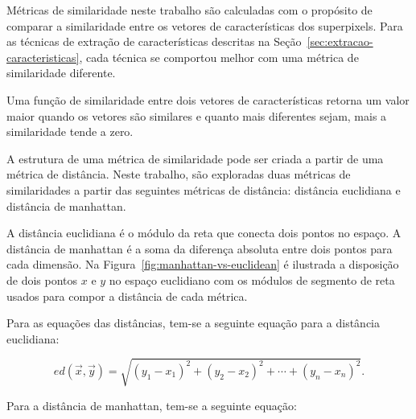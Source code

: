 Métricas de similaridade neste trabalho são calculadas com o propósito
de comparar a similaridade entre os vetores de características dos
superpixels. Para as técnicas de extração de características descritas
na Seção~\ref{sec:extracao-caracteristicas}, cada técnica se comportou
melhor com uma métrica de similaridade diferente.

Uma função de similaridade entre dois vetores de características
retorna um valor maior quando os vetores são similares e quanto mais
diferentes sejam, mais a similaridade tende a zero.

A estrutura de uma métrica de similaridade pode ser criada a partir de
uma métrica de distância. Neste trabalho, são exploradas duas métricas de
similaridades a partir das seguintes métricas de distância: distância
euclidiana e distância de manhattan.

A distância euclidiana é o módulo da reta que conecta dois pontos no
espaço. A distância de manhattan é a soma da diferença absoluta entre
dois pontos para cada dimensão. Na
Figura~\ref{fig:manhattan-vs-euclidean} é ilustrada a disposição de
dois pontos $ x $ e $ y $ no espaço euclidiano com os módulos de
segmento de reta usados para compor a distância de cada métrica.

\begin{figure}[!h]
        \captionsetup{width=8cm}
		\centering
\end{figure}
\FloatBarrier{}

Para as equações das distâncias, tem-se a seguinte equação para a
distância euclidiana:

\begin{equation}\label{eq:euclidian-distance}
ed(\vec{x}, \vec{y}) = \sqrt{{(y_1-x_1)}^2 + {(y_2-x_2)}^2 + \cdots + {(y_n-x_n)}^2}.
\end{equation}

Para a distância de manhattan, tem-se a seguinte equação:

